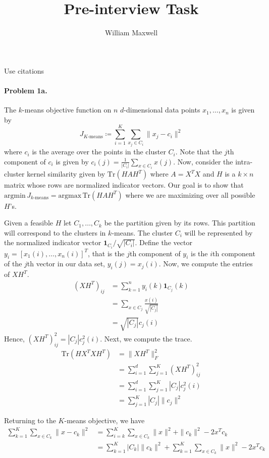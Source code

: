 \documentclass[12pt]{article}
\newcommand{\Tr}{\mathrm{Tr}}
\newcommand{\one}{\mathbf{1}}
\begin{document}
\title{Pre-interview Task}
\author{William Maxwell} 
\maketitle
Use citations \cite{Ding2005,Ding2008}
\paragraph{Problem 1a.}
The $k$-means objective function on $n$ $d$-dimensional data points $x_1,\dots,x_n$ is given by \[J_{K\text{-means}} \coloneqq \sum_{i=1}^K \sum_{x_j \in C_i} \|x_j - c_i\|^2 \] where $c_i$ is the average over the points in the cluster $C_i$. Note that the $j$th component of $c_i$ is given by $c_i(j) = \frac{1}{|C_i|}\sum_{x \in C_i} x(j)$.
Now, consider the intra-cluster kernel similarity given by $\Tr(HAH^T)$ where $A = X^TX$ and $H$ is a $k \times n$ matrix whose rows are normalized indicator vectors. Our goal is to show that $\mathrm{argmin} \, J_{k\text{-means}} = \mathrm{argmax} \, \Tr(HAH^T)$ where we are maximizing over all possible $H$'s.

Given a feasible $H$ let $C_1,\dots,C_k$ be the partition given by its rows. This partition will correspond to the clusters in $k$-means. The cluster $C_i$ will be represented by the normalized indicator vector $\one_{C_i} / \sqrt{|C_i|}$.
Define the vector $y_i = [x_1(i),\dots,x_n(i)]^T$, that is the $j$th component of $y_i$ is the $i$th component of the $j$th vector in our data set, $y_i(j) = x_j(i)$. Now, we compute the entries of $XH^T$.
\begin{align*}
(XH^T)_{ij} &= \sum_{k=1}^n y_i(k) \one_{C_j}(k)\\
&= \sum_{x \in C_j} \frac{x(i)}{\sqrt{|C_j|}} \\
&= \sqrt{|C_j|} c_j(i)
\end{align*}
Hence, $(XH^T)_{ij}^2 = |C_j|c_j^2(i)$. Next, we compute the trace.
\begin{align*}
\Tr(HX^TXH^T) &= \|XH^T\|^2_F \\
&= \sum_{i=1}^d \sum_{j=1}^K \left( X H^T \right)^2_{ij} \\
&= \sum_{i=1}^d \sum_{j=1}^K |C_j| c_j^2(i) \\
&= \sum_{j=1}^K |C_j| \|c_j\|^2
\end{align*}

Returning to the $K$-means objective, we have
\begin{align*}
\sum_{k=1}^K \sum_{x \in C_k} \|x - c_k\|^2 &= \sum_{i=k}^K \sum_{x \in C_k} \|x\|^2 + \|c_k\|^2 - 2x^Tc_k \\
&= \sum_{k=1}^K |C_k|\|c_k\|^2 + \sum_{k=1}^K \sum_{x \in C_k} \|x\|^2 - 2x^T c_k
\end{align*}
\end{document}

